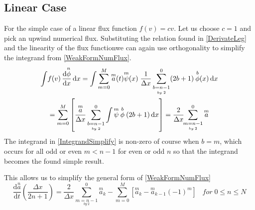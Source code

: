\documentclass[letterpaper]{article}
\begin{document}
\subsection{Linear Case}
For the simple case of a linear flux function $f(v) = cv$. Let us choose $c=1$ and pick an upwind numerical flux. Substituting the relation found in \eqref{DerivateLeg} and the linearity of the flux functionwe can again use orthogonality to simplify the integrand from \eqref{WeakFormNumFlux}.
	\begin{gather}\label{IntegrandSimplify}
	\int\! f(v) \,\frac{\mathrm{d} \overset{n}{\phi}}{\mathrm{d} x} \,\mathrm{d}x
	= \int \sum_{m=0}^M \overset{m}{a}(t)\overset{m}{\psi}(x) \;\frac{1}{\Delta x} \sum_{\underset{by \; 2}{b=n-1}}^0 (2b+1) \:\overset{b}{\phi}(x) \,\mathrm{d}x \notag \\
	= \sum_{m=0}^M \left[ \frac{\overset{m}{a}}{\Delta x} \sum_{\underset{by \; 2}{b=n-1}}^0 \int \overset{m}{\psi} \:\overset{b}{\phi} \:(2b+1) \,\mathrm{d}x \right]
	= \frac{2}{\Delta x}\!\! \sum_{\underset{by \: 2}{m=n-1}}^0 \overset{m}{a}
	\end{gather}
The integrand in \eqref{IntegrandSimplify} is non-zero of course when $b=m$, which occurs for all odd or even $m<n-1$ for even or odd $n$ so that the integrand becomes the found simple result.

This allows us to simplify the general form of \eqref{WeakFormNumFlux}
	\begin{equation}\label{WFLinearIntermed}
	\frac{\mathrm{d}\overset{n}{a}}{\mathrm{d} t}\left(\frac{\Delta x}{2n+1}\right)
	= \frac{2}{\Delta x}\!\! \sum_{\underset{by \: 2}{m=n-1}}^0 \overset{m}{a}_k
	-\sum_{m=0}^M \left[ \overset{m}{a}_k - \overset{m}{a}_{k-1}(-1)^m \right]
	\;\;\; for \; 0 \leq n \leq N
	\end{equation}
\end{document}
